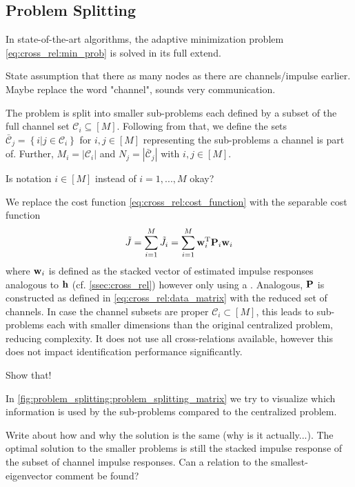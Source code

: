 \documentclass{article}
\newcommand{\h}{\mtxb{h}}
\newcommand{\w}{\mtxb{w}}
\newcommand{\aRho}{\mtxb{P}}
\newcommand{\Cset}{\mathcal{C}}
\newcommand{\Csetb}{\bar{\mathcal{C}}}
\begin{document}
\subsection{Problem Splitting}
\label{ssec:problem_splitting}
In state-of-the-art algorithms, the adaptive minimization problem \eqref{eq:cross_rel:min_prob} is solved in its full extend.
\begin{note}
    State assumption that there as many nodes as there are channels/impulse earlier. Maybe replace the word "channel", sounds very communication.
\end{note}
The problem is split into smaller sub-problems each defined by a subset of the full channel set \(\Cset_i \subseteq [M]\).
Following from that, we define the sets \(\Csetb_j = \left\{ i \vert j \in \Cset_i \right\}\) for \(i,j \in [M]\) representing the sub-problems a channel is part of. 
Further, \(M_i = \left| \Cset_i \right| \) and \(N_j = \left| \Csetb_j \right| \) with \(i,j \in [M]\).
\begin{attention}
    Is notation \(i \in [M]\) instead of \(i=1,...,M\) okay?
\end{attention}
We replace the cost function \eqref{eq:cross_rel:cost_function} with the separable cost function 
\begin{equation}
    \tilde{J} = \sum_{i=1}^M \tilde{J}_i  = \sum_{i=1}^M \w_i^\T \aRho_i \w_i
\end{equation}
where \(\w_i\) is defined as the stacked vector of estimated impulse responses analogous to \(\h\) (cf. \autoref{ssec:cross_rel}) however only using a .
Analogous, \(\aRho\) is constructed as defined in \eqref{eq:cross_rel:data_matrix} with the reduced set of channels.
In case the channel subsets are proper \(\Cset_i \subset [M]\), this leads to sub-problems each with smaller dimensions than the original centralized problem, reducing complexity.
It does not use all cross-relations available, however this does not impact identification performance significantly. 
\begin{attention}
    Show that!
\end{attention}
In \autoref{fig:problem_splitting:problem_splitting_matrix} we try to visualize which information is used by the sub-problems compared to the centralized problem.
\begin{attention}
    Write about how and why the solution is the same (why is it actually...). The optimal solution to the smaller problems is still the stacked impulse response of the subset of channel impulse responses. Can a relation to the smallest-eigenvector comment be found?
\end{attention}
\end{document}
